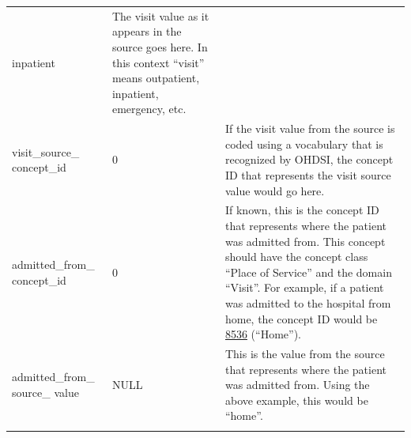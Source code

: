 \documentclass[11pt]{book}
\begin{document}
\begin{longtable}[]{@{}lll@{}}
\begin{minipage}[t]{0.16\columnwidth}
inpatient\strut
\end{minipage} & \begin{minipage}[t]{0.48\columnwidth}\raggedright\strut
The visit value as it appears in the source goes here. In this context
``visit'' means outpatient, inpatient, emergency, etc.\strut
\end{minipage}\tabularnewline
\begin{minipage}[t]{0.28\columnwidth}\raggedright\strut
visit\_source\_ concept\_id\strut
\end{minipage} & \begin{minipage}[t]{0.16\columnwidth}\raggedright\strut
0\strut
\end{minipage} & \begin{minipage}[t]{0.48\columnwidth}\raggedright\strut
If the visit value from the source is coded using a vocabulary that is
recognized by OHDSI, the concept ID that represents the visit source
value would go here.\strut
\end{minipage}\tabularnewline
\begin{minipage}[t]{0.28\columnwidth}\raggedright\strut
admitted\_from\_ concept\_id\strut
\end{minipage} & \begin{minipage}[t]{0.16\columnwidth}\raggedright\strut
0\strut
\end{minipage} & \begin{minipage}[t]{0.48\columnwidth}\raggedright\strut
If known, this is the concept ID that represents where the patient was
admitted from. This concept should have the concept class ``Place of
Service'' and the domain ``Visit''. For example, if a patient was
admitted to the hospital from home, the concept ID would be
\href{http://athena.ohdsi.org/search-terms/terms/8536}{8536}
(``Home'').\strut
\end{minipage}\tabularnewline
\begin{minipage}[t]{0.28\columnwidth}\raggedright\strut
admitted\_from\_ source\_ value\strut
\end{minipage} & \begin{minipage}[t]{0.16\columnwidth}\raggedright\strut
NULL\strut
\end{minipage} & \begin{minipage}[t]{0.48\columnwidth}\raggedright\strut
This is the value from the source that represents where the patient was
admitted from. Using the above example, this would be ``home''.\strut
\end{minipage}\tabularnewline
\begin{minipage}[t]{0.28\columnwidth}\raggedright\strut

\end{minipage}
\end{longtable}
\end{document}
